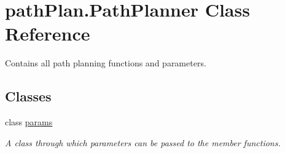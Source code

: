 \hypertarget{classpath_plan_1_1_path_planner}{}\section{path\+Plan.\+Path\+Planner Class Reference}
\label{classpath_plan_1_1_path_planner}


Contains all path planning functions and parameters.  


\subsection*{Classes}
\begin{DoxyCompactItemize}
\item 
class \mbox{\hyperlink{classpath_plan_1_1_path_planner_1_1params}{params}}
\begin{DoxyCompactList}\small\item\em A class through which parameters can be passed to the member functions. \end{DoxyCompactList}\end{DoxyCompactItemize}
